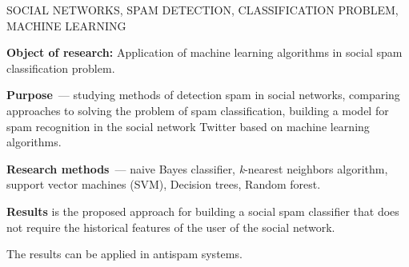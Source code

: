 \pagebreak


\begin{abstract:en}

SOCIAL NETWORKS, SPAM DETECTION, CLASSIFICATION PROBLEM, MACHINE LEARNING

\textbf{Object of research:} Application of machine learning algorithms in social spam classification problem.

\textbf{Purpose}~--- studying methods of detection spam in social networks, comparing approaches to solving the problem of spam classification, building a model for spam recognition in the social network Twitter based on machine learning algorithms.

\textbf{Research methods}~--- naive Bayes classifier, \textit{k}-nearest neighbors algorithm, support vector machines (SVM), Decision trees, Random forest.

\textbf{Results} is the proposed approach for building a social spam classifier that does not require the historical features of the user of the social network.

The results can be applied in antispam systems.
\end{abstract:en}
